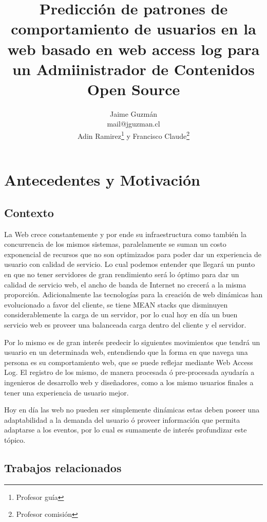 \documentclass{udparticle}
\title{ Predicción de patrones de comportamiento de usuarios en la web basado en web access log para un Admiinistrador de Contenidos Open Source}
\author{  
  Jaime Guzmán\\{\small\ttfamily mail@jguzman.cl}\protect\\[5pt]%
  {\small Adin Ramirez\thanks{Profesor guía} y Francisco Claude\thanks{Profesor comisión}}%
  }
\begin{document}
\maketitle

\section{Antecedentes y Motivación}

\subsection{Contexto}


  La Web crece constantemente y por ende su infraestructura como también la concurrencia de los mismos sistemas, paralelamente se suman un costo exponencial de recursos que no son optimizados para poder dar un experiencia de usuario con calidad de servicio.
  Lo cual podemos entender que llegará un punto en que no tener servidores de gran rendimiento será lo óptimo para dar un calidad de servicio web, el ancho de banda de Internet no crecerá a la misma proporción. Adicionalmente las tecnologías para la creación de  web dinámicas han evolucionado a favor del cliente, se tiene MEAN stacks que disminuyen considerablemente la carga de un servidor, por lo cual hoy en día un buen servicio web  es proveer una balanceada carga dentro del cliente y el servidor.

  Por lo mismo es de gran interés predecir lo siguientes movimientos que tendrá un usuario en un determinada web, entendiendo que la forma en que navega una persona es su comportamiento web, que se puede reflejar mediante Web Access Log. El registro de los mismo, de manera procesada ó pre-procesada ayudaría a ingenieros de desarrollo web y diseñadores, como a los mismo usuarios finales a tener una experiencia de usuario mejor.
  
  Hoy en día las web no pueden ser simplemente dinámicas estas deben poseer una adaptabilidad a la demanda del usuario ó proveer información que permita adaptarse a los eventos, por lo cual es sumamente de interés profundizar este tópico.








 

\subsection{Trabajos relacionados}
\end{document}
